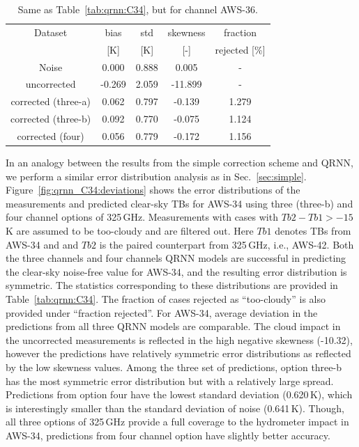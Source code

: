 \documentclass[12pt]{article}
\begin{document}
\begin{table}[!p]
	\centering
	\begin{tabular}[b]{c|c|c|c|c}
		Dataset  		  &   bias &   std &   skewness & fraction  \\
		&   [K]  &   [K] & [-] & rejected [\%]\\
		\hline
		Noise                       &  0.000 & 0.888  &              0.005 &      - \\
		uncorrected                 & -0.269 & 2.059 &            -11.899 &      - \\
		corrected (three-a) 		&  0.062 & 0.797 &             -0.139 &      1.279 \\
		corrected (three-b) 		&  0.092 & 0.770 &             -0.075 &      1.124 \\
		corrected (four)   			&  0.056 & 0.779 &             -0.172 &      1.156 \\
		
		
		\hline
	\end{tabular}
	\caption{ Same as Table~\ref{tab:qrnn:C34}, but for channel AWS-36.}
	\label{tab:qrnn:C36}
\end{table}


In an analogy between the results from the simple correction scheme and QRNN, we perform a similar error distribution analysis as in Sec.~\ref{sec:simple}. Figure~\ref{fig:qrnn_C34:deviations} shows the error distributions of the measurements and predicted clear-sky TBs for AWS-34 using three (three-b) and four channel options of 325\,GHz. Measurements with cases with $Tb2 - Tb1 > -15$\,K are assumed to be too-cloudy and are filtered out. Here $Tb1$ denotes TBs from AWS-34 and and $Tb2$ is the paired counterpart from 325\,GHz, i.e., AWS-42.  Both the three channels and four channels QRNN models are successful in predicting the clear-sky noise-free value for AWS-34, and the resulting error distribution is symmetric. The statistics corresponding to these distributions are provided in Table~\ref{tab:qrnn:C34}. The fraction of cases rejected as ``too-cloudy'' is also provided under ``fraction rejected''. For AWS-34, average deviation in the predictions from all three QRNN models are comparable.  The cloud impact in the uncorrected measurements is reflected in the high negative skewness (-10.32), however the predictions have relatively symmetric error distributions as reflected by the low skewness values. Among the three set of predictions, option three-b has the most symmetric error distribution but with a relatively large spread. Predictions from option four have the lowest standard deviation (0.620\,K), which is interestingly smaller than the standard deviation of noise (0.641\,K). Though, all three options of 325\,GHz provide a full coverage to the hydrometer impact in AWS-34, predictions from four channel option have slightly better accuracy.
\end{document}
